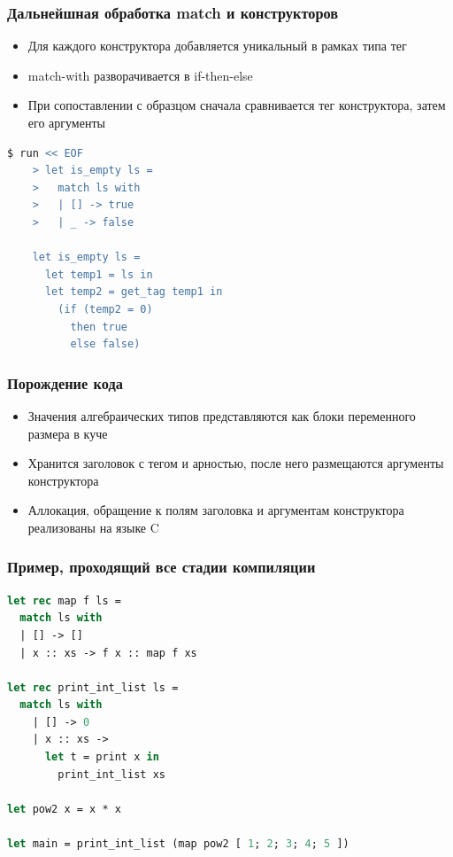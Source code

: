 \documentclass
  [ russian
  , aspectratio=43
  ] {beamer}
\begin{document}
\begin{frame}[fragile]
    \frametitle{Дальнейшная обработка match и конструкторов}

    \begin{itemize}
        \item Для каждого конструктора добавляется уникальный в рамках типа тег
        \item  \texttt\small{match-with} разворачивается в \texttt\small{if-then-else}
        \item При сопоставлении с образцом сначала сравнивается тег конструктора, затем его аргументы


    \end{itemize}
    \begin{lstlisting}[language=ML]
    $ run << EOF
    > let is_empty ls =
    >   match ls with
    >   | [] -> true
    >   | _ -> false

    let is_empty ls =
      let temp1 = ls in
      let temp2 = get_tag temp1 in
        (if (temp2 = 0)
          then true
          else false)
    \end{lstlisting}
\end{frame}

\begin{frame}
    \frametitle{Порождение кода}
    \begin{itemize}
        \item Значения алгебраических типов представляются как блоки переменного размера в куче

        \item Хранится заголовок с тегом и арностью, после него размещаются аргументы конструктора

        \item Аллокация, обращение к полям заголовка и аргументам конструктора реализованы на языке C
    \end{itemize}
\end{frame}


\begin{frame}[fragile]
    \frametitle{Пример, проходящий все стадии компиляции}

    \begin{lstlisting}[language=ML]
let rec map f ls =
  match ls with
  | [] -> []
  | x :: xs -> f x :: map f xs

let rec print_int_list ls =
  match ls with
    | [] -> 0
    | x :: xs ->
      let t = print x in
        print_int_list xs

let pow2 x = x * x

let main = print_int_list (map pow2 [ 1; 2; 3; 4; 5 ])
    \end{lstlisting}

\end{frame}
\end{document}
